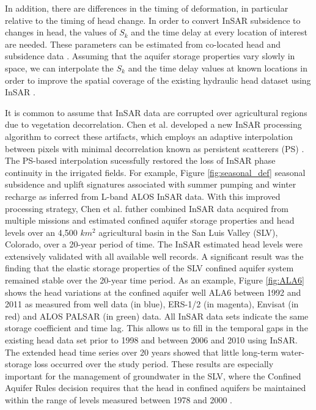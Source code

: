 \documentclass[11pt,final]{article}%
\renewcommand{\citep}{\cite}
\begin{document}
In addition, there are differences in the timing of deformation, in particular relative to the timing of head change. In order to convert InSAR subsidence to changes in head, the values of $S_{k}$  and the time delay at every location of interest are needed. These parameters can be estimated from co-located head and subsidence data \citep{Chen2016}. Assuming that the aquifer storage properties vary slowly in space, we can interpolate the $S_{k}$ and the time delay values at known locations in order to improve the spatial coverage of the existing hydraulic head dataset using InSAR \citep{Chen2017}.

It is common to assume that InSAR data are corrupted over agricultural regions due to vegetation decorrelation. Chen et al. \cite{Chen2015}  developed a new InSAR processing algorithm to correct these artifacts, which employs an adaptive interpolation between pixels with minimal decorrelation known as persistent scatterers (PS) \citep{Shanker2007}. The PS-based interpolation sucessfully restored the loss of InSAR phase continuity in the irrigated fields. For example, Figure \ref{fig:seasonal_def} seasonal subsidence and uplift signatures associated with summer pumping and winter recharge as inferred from L-band ALOS InSAR data. With this improved processing strategy, Chen et al. \cite{Chen2017} futher combined InSAR data acquired from multiple missions and estimated confined aquifer storage properties and head levels over an 4,500 $km^2$ agricultural basin in the San Luis Valley (SLV), Colorado, over a 20-year period of time. The InSAR estimated head levels were extensively validated with all available well records. A significant result was the finding that the elastic storage properties of the SLV confined aquifer system remained stable over the 20-year time period. As an example, Figure \ref{fig:ALA6} shows the head variations at the confined aquifer well ALA6 between 1992 and 2011 as measured from well data (in blue), ERS-1/2 (in magenta), Envisat (in red) and ALOS PALSAR (in green) data. All InSAR data sets indicate the same storage coefficient and time lag. This allows us to fill in the temporal gaps in the existing head data set prior to 1998 and between 2006 and 2010 using InSAR. The extended head time series over 20 years showed that little long-term water-storage loss occurred over the study period. These results are especially important for the management of groundwater in the SLV, where the Confined Aquifer Rules decision requires that the head in confined aquifers be maintained within the range of levels measured between 1978 and 2000 \citep{Rules}.
\end{document}
